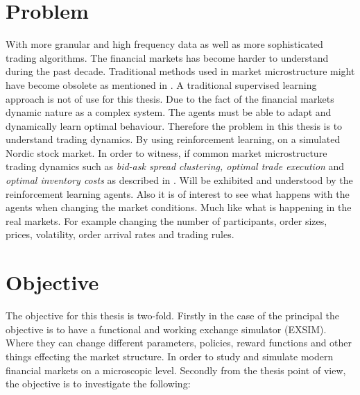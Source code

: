 \documentclass{kththesis}
\theoremstyle{definition}
\begin{document}

\section{Problem}
With more granular and high frequency data as well as more sophisticated trading algorithms. The financial markets has become harder to understand during the past decade. Traditional methods used in market microstructure might have become obsolete as mentioned in \textcite{o2015high}. A traditional supervised learning approach is not of use for this thesis. Due to the fact of the financial markets dynamic nature as a complex system. The agents must be able to adapt and dynamically learn optimal behaviour.  Therefore the problem in this thesis is to understand trading dynamics. By using reinforcement learning, on a simulated Nordic stock market. 
\newline
\newline
In order to witness, if common market microstructure trading dynamics such as \textit{bid-ask spread clustering, optimal trade execution} and \textit{optimal inventory costs} as described in \textcite{o1995market}. Will be exhibited and understood by the reinforcement learning agents. Also it is of interest to see what happens with the agents when changing the market conditions. Much like what is happening in the real markets. For example changing the number of participants, order sizes, prices, volatility, order arrival rates and trading rules.



\section{Objective}
The objective for this thesis is two-fold. Firstly in the case of the principal the objective is to have a functional and working exchange simulator (EXSIM). Where they can change different parameters, policies, reward functions and other things effecting the market structure. In order to study and simulate modern financial markets on a microscopic level. Secondly from the thesis point of view, the objective is to investigate the following:
\end{document}
